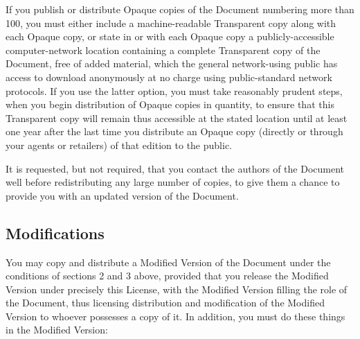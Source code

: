 	If you publish or distribute Opaque copies of the Document numbering more than 100, you must either include a machine-readable Transparent copy along with each Opaque copy, or state in or with each Opaque copy a publicly-accessible computer-network location containing a complete Transparent copy of the Document, free of added material, which the general network-using public has access to download anonymously at no charge using public-standard network protocols. If you use the latter option, you must take reasonably prudent steps, when you begin distribution of Opaque copies in quantity, to ensure that this Transparent copy will remain thus accessible at the stated location until at least one year after the last time you distribute an Opaque copy (directly or through your agents or retailers) of that edition to the public. 

	It is requested, but not required, that you contact the authors of the Document well before redistributing any large number of copies, to give them a chance to provide you with an updated version of the Document. 

	\subsection{Modifications}

	You may copy and distribute a Modified Version of the Document under the conditions of sections 2 and 3 above, provided that you release the Modified Version under precisely this License, with the Modified Version filling the role of the Document, thus licensing distribution and modification of the Modified Version to whoever possesses a copy of it. In addition, you must do these things in the Modified Version: 
	
